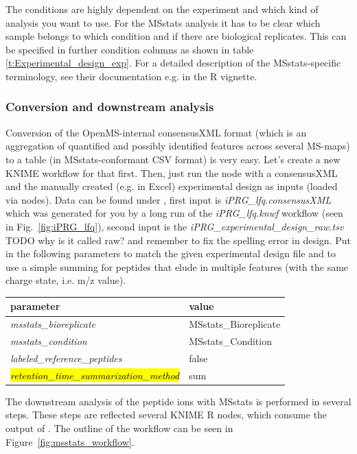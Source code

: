 \noindent The conditions are highly dependent on the experiment and which kind of analysis you want to use. For the MSstats analysis it has to be clear which sample belongs to which condition and if there are biological replicates. This can be specified in further condition columns as shown in table \ref{t:Experimental_design_exp}. For a detailed description of the MSstats-specific
terminology, see their documentation e.g. in the R vignette.

\subsubsection{Conversion and downstream analysis}
\label{sec:MSstatsConversion}

Conversion of the OpenMS-internal consensusXML format (which is an aggregation of quantified and possibly identified features across several MS-maps) to a table (in MSstats-conformant CSV format) is very easy. Let's create a new KNIME workflow for that first. Then, just run the  node with a consensusXML and the manually created (e.g. in Excel) experimental design as inputs (loaded via  nodes). Data can be found under , first input is \textit{iPRG\_lfq.consensusXML} which was generated for you by a long run of the \textit{iPRG\_lfq.knwf} workflow (seen in Fig.~\ref{fig:iPRG_lfq}), second input is the \textit{iPRG\_experimental\_design\_raw.tsv} TODO why is it called raw? and remember to fix the spelling error in design. Put in the following parameters to match the given experimental design file and to use a simple summing for peptides that elude in multiple features (with the same charge state, i.e. m/z value).
\begin{center}
	\begin{tabular}{l|l}
		\textbf{parameter} & \textbf{value} \\ \hline
		\textit{msstats\_bioreplicate} & MSstats\_Bioreplicate \\
		\textit{msstats\_condition} & MSstats\_Condition \\
		\textit{labeled\_reference\_peptides} & false \\
		\hl{\textit{retention\_time\_summarization\_method}} & sum\\
	\end{tabular}
\end{center}

The downstream analysis of the peptide ions with MSstats is performed in several
steps. These steps are reflected several KNIME R nodes, which consume
the output of . The outline of the workflow can be
seen in Figure~\ref{fig:msstats_workflow}.

